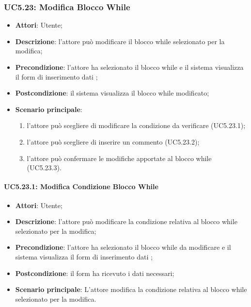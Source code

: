\subsubsection{UC5.23: Modifica Blocco While}
\label{UC5.23}
\begin{itemize}
\item \textbf{Attori}: Utente;
\item \textbf{Descrizione}: l'attore può modificare il blocco while selezionato per la modifica;
\item \textbf{Precondizione}: l'attore ha selezionato il blocco while e il sistema visualizza il form di inserimento dati ;	
\item \textbf{Postcondizione}: il sistema visualizza il blocco while modificato;	
\item \textbf{Scenario principale}:
\begin{enumerate}
\item l'attore può scegliere di modificare la condizione da verificare (UC5.23.1);
\item l'attore può scegliere di inserire un commento (UC5.23.2);
\item l'attore può confermare le modifiche apportate al blocco while (UC5.23.3).
\end{enumerate}
\end{itemize}
\paragraph{UC5.23.1: Modifica Condizione Blocco While}
\label{UC5.23.1}
\begin{itemize}
\item \textbf{Attori}: Utente;
\item \textbf{Descrizione}: l'attore può modificare la condizione relativa al blocco while selezionato per la modifica;
\item \textbf{Precondizione}: l'attore ha selezionato il blocco while da modificare e il sistema visualizza il form di inserimento dati ;	
\item \textbf{Postcondizione}: il form ha ricevuto i dati necessari;	
\item \textbf{Scenario principale}:
L'attore modifica la condizione relativa al blocco while selezionato per la modifica.
\end{itemize}
